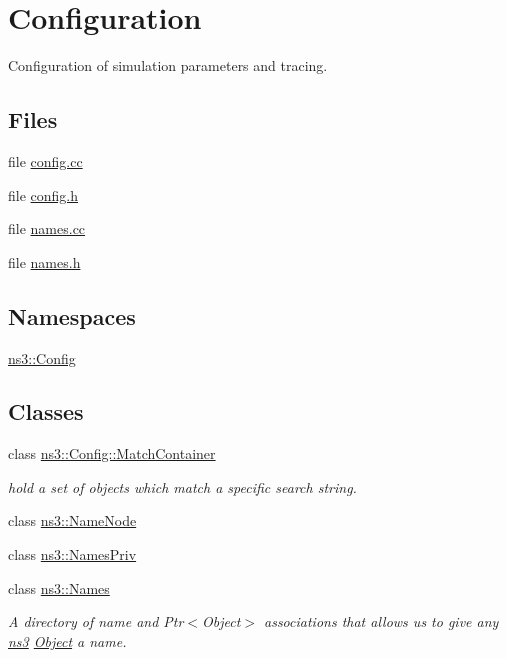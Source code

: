\hypertarget{group__config}{}\section{Configuration}
\label{group__config}


Configuration of simulation parameters and tracing.  


\subsection*{Files}
\begin{DoxyCompactItemize}
\item 
file \hyperlink{config_8cc}{config.\+cc}
\item 
file \hyperlink{config_8h}{config.\+h}
\item 
file \hyperlink{names_8cc}{names.\+cc}
\item 
file \hyperlink{names_8h}{names.\+h}
\end{DoxyCompactItemize}
\subsection*{Namespaces}
\begin{DoxyCompactItemize}
\item 
 \hyperlink{namespacens3_1_1Config}{ns3\+::\+Config}
\end{DoxyCompactItemize}
\subsection*{Classes}
\begin{DoxyCompactItemize}
\item 
class \hyperlink{classns3_1_1Config_1_1MatchContainer}{ns3\+::\+Config\+::\+Match\+Container}
\begin{DoxyCompactList}\small\item\em hold a set of objects which match a specific search string. \end{DoxyCompactList}\item 
class \hyperlink{classns3_1_1NameNode}{ns3\+::\+Name\+Node}
\item 
class \hyperlink{classns3_1_1NamesPriv}{ns3\+::\+Names\+Priv}
\item 
class \hyperlink{classns3_1_1Names}{ns3\+::\+Names}
\begin{DoxyCompactList}\small\item\em A directory of name and Ptr$<$\+Object$>$ associations that allows us to give any \hyperlink{namespacens3}{ns3} \hyperlink{classns3_1_1Object}{Object} a name. \end{DoxyCompactList}\end{DoxyCompactItemize}
